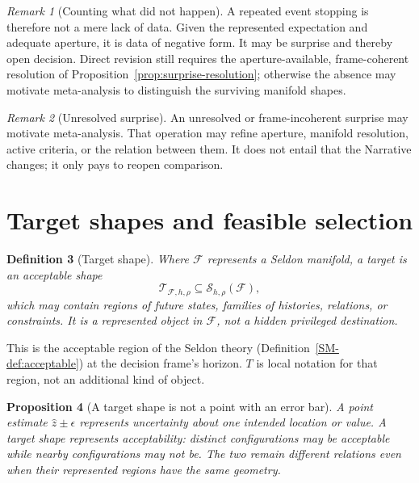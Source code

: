 \documentclass[11pt,a4paper]{article}
\newtheorem{definition}{Definition}[section]
\newtheorem{proposition}[definition]{Proposition}
\theoremstyle{remark}
\newtheorem{remark}[definition]{Remark}
\newcommand{\Frame}{\mathcal F}
\newcommand{\Seldon}{\mathcal S}
\newcommand{\Target}{\mathcal T}
\begin{document}
\begin{remark}[Counting what did not happen]\label{rem:nonoccurrence}
A repeated event stopping is therefore not a mere lack of data. Given the
represented expectation and adequate aperture, it is data of negative form. It
may be surprise and thereby open decision. Direct revision still requires the
aperture-available, frame-coherent resolution of
Proposition~\ref{prop:surprise-resolution}; otherwise the absence may motivate
meta-analysis to distinguish the surviving manifold shapes.
\end{remark}

\begin{remark}[Unresolved surprise]\label{rem:unresolved}
An unresolved or frame-incoherent surprise may motivate meta-analysis. That
operation may refine aperture, manifold resolution, active criteria, or the
relation between them. It does not entail that the Narrative changes; it only
pays to reopen comparison.
\end{remark}

\section{Target shapes and feasible selection}\label{sec:targets}

\begin{definition}[Target shape]\label{def:target-shape}
Where \(\Frame\) represents a Seldon manifold, a target is an acceptable shape
\[
\Target_{\Frame,h,\rho}\subseteq\Seldon_{h,\rho}(\Frame),
\]
which may contain regions of future states, families of histories, relations,
or constraints. It is a represented object in \(\Frame\), not a hidden
privileged destination.
\end{definition}
This is the acceptable region of the Seldon theory
(Definition~\ref{SM-def:acceptable}) at the decision frame's horizon.
$T$ is local notation for that region, not an additional kind of object.



\begin{proposition}[A target shape is not a point with an error bar]\label{prop:shape-not-point}
A point estimate \(\hat z\pm\epsilon\) represents uncertainty about one intended
location or value. A target shape represents acceptability: distinct
configurations may be acceptable while nearby configurations may not be. The
two remain different relations even when their represented regions have
the same geometry.
\end{proposition}
\end{document}
